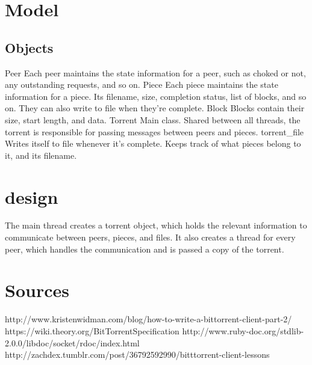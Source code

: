 \documentclass[12pt]{article}
\begin{document}
\section{Model}
\subsection{Objects}
\begin{outline}
  \1 Peer
  \2 Each peer maintains the state information for a peer, such as choked or not, any outstanding requests, and so on.
  \1 Piece
  \2 Each piece maintains the state information for a piece.  Its filename, size, completion status, list of blocks, and so on.  They can also write to file when they're complete.
  \1 Block
  \2 Blocks contain their size, start length, and data.
  \1 Torrent
  \2 Main class.  Shared between all threads, the torrent is responsible for passing messages between peers and pieces.
  \1 torrent\_file
  \2 Writes itself to file whenever it's complete.  Keeps track of what pieces belong to it, and its filename.
\end{outline}
\section{design}
The main thread creates a torrent object, which holds the relevant information to communicate between peers, pieces, and files.  It also creates a thread for every peer, which handles the communication and is passed a copy of the torrent.
\section{Sources}
\begin{outline}
\1 http://www.kristenwidman.com/blog/how-to-write-a-bittorrent-client-part-2/
\1 https://wiki.theory.org/BitTorrentSpecification
\1 http://www.ruby-doc.org/stdlib-2.0.0/libdoc/socket/rdoc/index.html
\1 http://zachdex.tumblr.com/post/36792592990/bitttorrent-client-lessons
\end{outline}
\end{document}
